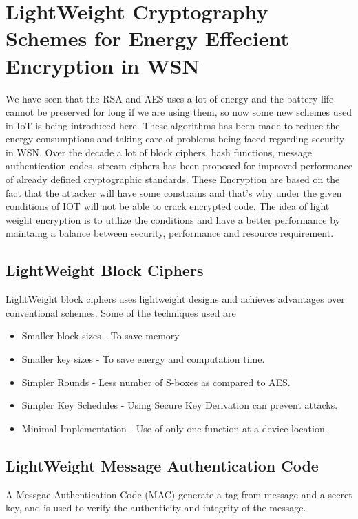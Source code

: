 \documentclass[conference]{IEEEtran}
\begin{document}
\section{LightWeight Cryptography Schemes for Energy Effecient Encryption in WSN}
We have seen that the RSA and AES uses a lot of energy and the battery life cannot be preserved for long if we are using them, so now some new schemes used in IoT is being introduced here. These algorithms has been made to reduce the energy consumptions and taking care of problems being faced regarding security in WSN.
\linebreak
Over the decade a lot of block ciphers, hash functions, message authentication codes, stream ciphers has been proposed for improved performance of already defined cryptographic standards. These Encryption are based on the fact that the attacker will have some constrains and that's why under the given conditions of IOT will not be able to crack encrypted code. The idea of light weight encryption is to utilize the conditions and have a better performance by maintaing a balance between security, performance and resource requirement.

\subsection{LightWeight Block Ciphers}
LightWeight block ciphers uses lightweight designs and achieves advantages over conventional schemes. Some of the techniques used are
\begin{itemize}
  \item Smaller block sizes - To save memory
  \item Smaller key sizes - To save energy and computation time.
  \item Simpler Rounds - Less number of S-boxes as compared to AES.
  \item Simpler Key Schedules - Using Secure Key Derivation can prevent attacks.
  \item Minimal Implementation - Use of only one function at a device location.
\end{itemize}

\subsection{LightWeight Message Authentication Code}
A Messgae Authentication Code (MAC) generate a tag from message and a secret key, and is used to verify the authenticity and integrity of the message.
\end{document}
